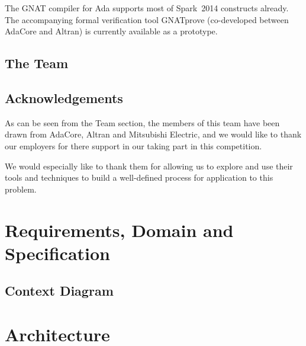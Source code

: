 \documentclass{report}
\newcommand{\spark}[0]{{\sc Spark}}
\begin{document}
The GNAT compiler for Ada supports most of \spark\ 2014 constructs
already.  The accompanying formal verification tool GNATprove
(co-developed between AdaCore and Altran) is currently available as a
prototype.

\section{The Team}


\section{Acknowledgements}
As can be seen from the Team section, the members of this team have
been drawn from AdaCore, Altran and Mitsubishi Electric, and we would
like to thank our employers for there support in our taking part in
this competition.

We would especially like to thank them for allowing us to explore and
use their tools and techniques to build a well-defined process for
application to this problem.




\chapter{Requirements, Domain and Specification}
\section{Context Diagram}
\begin{center}
\end{center}





\chapter{Architecture}
\end{document}
